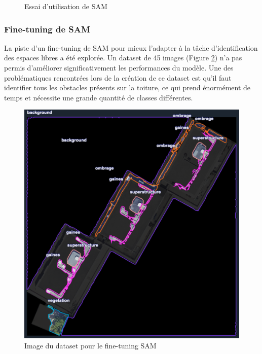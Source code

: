 \begin{figure}[H]
    \caption{Essai d'utilisation de SAM}
    \label{fig:essai_algo_sam}
\end{figure}

\subsubsection{Fine-tuning de SAM}
La piste d'un fine-tuning de SAM pour mieux l'adapter à la tâche d'identification des espaces libres a été explorée. Un dataset de 45 images (Figure \ref{fig:ch3_piste_exploree_classification_11_fine_tuning_dataset}) n'a pas permis d'améliorer significativement les performances du modèle. Une des problématiques rencontrées lors de la création de ce dataset est qu'il faut identifier tous les obstacles présents sur la toiture, ce qui prend énormément de temps et nécessite une grande quantité de classes différentes.

\begin{figure}[H]
    \centering
    \includegraphics[width=1\linewidth]{02-main/figures/ch3_piste_exploree_classification_11_fine_tuning_dataset.png}
    \caption{Image du dataset pour le fine-tuning SAM}
    \label{fig:ch3_piste_exploree_classification_11_fine_tuning_dataset}
\end{figure}

